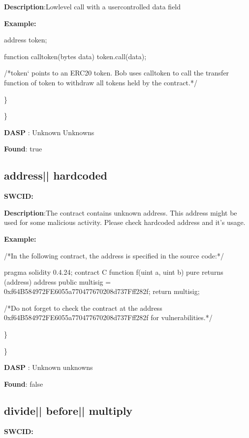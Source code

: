 \documentclass{article}
\begin{document}
\textbf{Description}:Low{\textendash}level call with a user{\textendash}controlled data field


\textbf{Example:} 
\begin{ffcode} 

address token;

function call\textunderscore token(bytes data){
  token.call(data);
}

 /*token` points to an ERC20 token. Bob uses call\textunderscore token to call the transfer function of token to withdraw all tokens held by the contract.*/ 

\end{ffcode} 
\} 

\} 

\textbf{DASP} : Unknown Unknowns

\textbf{Found}: true

\subsection{address{|\textunderscore| }hardcoded} 
\textbf{SWC{\textunderscore }ID:} 

\textbf{Description}:The contract contains unknown address. This address might be used for some malicious activity. Please check hardcoded address and it's usage.


\textbf{Example:} 
\begin{ffcode} 

/*In the following contract, the address is specified in the source code:*/ 

pragma solidity 0.4.24;
contract C {
  function f(uint a, uint b) pure returns (address) {
    address public multisig = 0xf64B584972FE6055a770477670208d737Fff282f;
    return multisig;
        }
}

 /*Do not forget to check the contract at the address 0xf64B584972FE6055a770477670208d737Fff282f for vulnerabilities.*/ 

\end{ffcode} 
\} 

\} 

\textbf{DASP} : Unknown unknowns

\textbf{Found}: false

\subsection{divide{|\textunderscore| }before{|\textunderscore| }multiply} 
\textbf{SWC{\textunderscore }ID:} 
\end{document}
